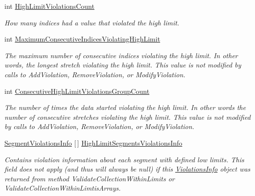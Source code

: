 \begin{DoxyCompactItemize}
int \mbox{\hyperlink{struct_c_s_i_1_1_library_1_1_array_utilities_1_1_array_limit_checks_1_1_violations_info_a08301f6b073dbc8cc429bdc940bab47e}{High\+Limit\+Violations\+Count}}
\begin{DoxyCompactList}\small\item\em How many indices had a value that violated the high limit. \end{DoxyCompactList}\item 
int \mbox{\hyperlink{struct_c_s_i_1_1_library_1_1_array_utilities_1_1_array_limit_checks_1_1_violations_info_a6961ce4c307f34c73607cfab9cd8a5d3}{Maximum\+Consecutive\+Indices\+Violating\+High\+Limit}}
\begin{DoxyCompactList}\small\item\em The maximum number of consecutive indices violating the high limit. In other words, the longest stretch violating the high limit. This value is not modified by calls to Add\+Violation, Remove\+Violation, or Modify\+Violation. \end{DoxyCompactList}\item 
int \mbox{\hyperlink{struct_c_s_i_1_1_library_1_1_array_utilities_1_1_array_limit_checks_1_1_violations_info_aeef692d5f786e24236df71201a84e684}{Consecutive\+High\+Limit\+Violations\+Group\+Count}}
\begin{DoxyCompactList}\small\item\em The number of times the data started violating the high limit. In other words the number of consecutive stretches violating the high limit. This value is not modified by calls to Add\+Violation, Remove\+Violation, or Modify\+Violation. \end{DoxyCompactList}\item 
\mbox{\hyperlink{class_c_s_i_1_1_library_1_1_array_utilities_1_1_array_limit_checks_1_1_segment_violations_info}{Segment\+Violations\+Info}} \mbox{[}$\,$\mbox{]} \mbox{\hyperlink{struct_c_s_i_1_1_library_1_1_array_utilities_1_1_array_limit_checks_1_1_violations_info_a0f7bee22ee490d5687371c2301096d13}{High\+Limit\+Segments\+Violations\+Info}}
\begin{DoxyCompactList}\small\item\em Contains violation information about each segment with defined low limits. This field does not apply (and thus will always be null) if this \mbox{\hyperlink{struct_c_s_i_1_1_library_1_1_array_utilities_1_1_array_limit_checks_1_1_violations_info}{Violations\+Info}} object was returned from method Validate\+Collection\+Within\+Limits or Validate\+Collection\+Within\+Limtis\+Arrays. \end{DoxyCompactList}\end{DoxyCompactItemize}


